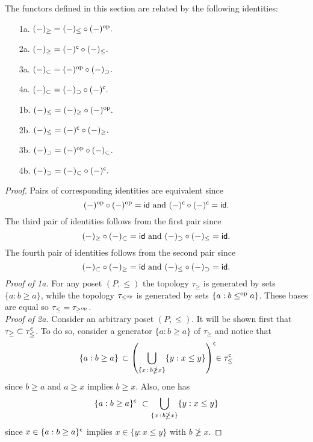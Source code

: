 \documentclass[main.tex]{subfiles}
\begin{document}
\begin{lemma} \label{Alexandorv spaces, posets and their dualities}
The functors defined in this section are related by the following identities:\vspace*{5pt}\par
\begin{minipage}[l]{7cm}
\begin{enumerate}
\item[1a.] $(-)_\geq=(-)_\leq\circ(-)^{\mathrm{op}}.$
\item[2a.] $(-)_\geq=(-)^{\mathsf{c}}\circ(-)_\leq.$
\item[3a.] $(-)_\subset=(-)^{\mathrm{op}}\circ(-)_\supset.$
\item[4a.] $(-)_\subset=(-)_\supset\circ(-)^{\mathsf{c}}.$
\end{enumerate}
\end{minipage}
\begin{minipage}{5cm}
\begin{enumerate}
\item[1b.] $(-)_\leq=(-)_\geq\circ(-)^{\mathrm{op}}.$
\item[2b.] $(-)_\leq=(-)^{\mathsf{c}}\circ(-)_\geq.$
\item[3b.] $(-)_\supset=(-)^{\mathrm{op}}\circ(-)_\subset.$
\item[4b.] $(-)_\supset=(-)_\subset\circ(-)^{\mathsf{c}}.$
\end{enumerate}

\end{minipage}

\begin{proof}
Pairs of corresponding identities are equivalent since $$(-)^{\mathrm{op}}\circ(-)^{\mathrm{op}}=\mathsf{id}\text{ and }(-)^{\mathsf{c}}\circ(-)^{\mathsf{c}}=\mathsf{id}.$$
The third pair of identities follows from the first pair since $$(-)_\geq\circ(-)_\subset=\mathsf{id}\text{ and }(-)_\supset\circ(-)_\leq=\mathsf{id}.$$
The fourth pair of identities follows from the second pair since $$(-)_\subset\circ(-)_\geq=\mathsf{id}\text{ and }(-)_\leq\circ(-)_\supset=\mathsf{id}.$$
\textit{Proof of 1a.}\! For any poset $(P,\leq)$ the topology $\tau_\geq$ is generated by sets $\{a:b\geq a\}$, while the topology $\tau_{\leq^{\mathrm{op}}}$ is generated by sets $\{a:b\leq^{\mathrm{op}} a\}$. These bases are equal so $\tau_\leq=\tau_{\geq^{\mathrm{op}}}$.\vspace*{3pt}\\
\textit{Proof of 2a.} \!Consider an arbitrary poset $(P,\leq)$. It will be shown first that $\tau_\geq\subset\tau_\leq^{\mathsf{c}}$. To do so, consider a generator $\{a:b\geq a\}$ of $\tau_\geq$ and notice that
\begin{equation*}
\{a:b\geq a\}\,\subset\left(\bigcup_{\{x\,:\,b\ngeq x\}}\{y:x\leq y\}\right)^{\mathsf{c}}\!\!\in\tau_\leq^{\mathsf{c}}
\end{equation*}
since $b\geq a$ and $a\geq x$ implies $b\geq x$. Also, one has
$$\{a:b\geq a\}^\c\ \subset\bigcup_{\{x\,:\,b\ngeq x\}}\{y:x\leq y\}\vspace*{-8pt}$$
since $x\in\{a:b\geq a\}^{\mathsf{c}}$ implies $x\in\{y:x\leq y\}$ with $b\ngeq x$.


\end{proof}
\end{lemma}
\end{document}
